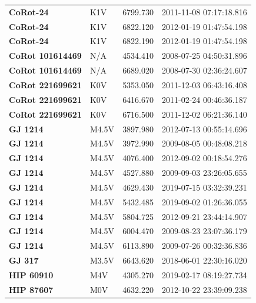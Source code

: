 \documentclass[linenumbers]{aastex701}
\providecommand{\DIFadd}[1]{{\bf #1}} %
\providecommand{\DIFaddbegin}{} %
\providecommand{\DIFaddend}{} %
\begin{document}
\begin{longtable}{|l|l|l|c|}
 \DIFaddbegin \DIFadd{CoRot-24 }\DIFaddend & K1V & 6799.730 & 2011-11-08 07:17:18.816 \\
 \DIFaddbegin \DIFadd{CoRot-24 }\DIFaddend & K1V & 6822.120 & 2012-01-19 01:47:54.198 \\
 \DIFaddbegin \DIFadd{CoRot-24 }\DIFaddend & K1V & 6822.190 & 2012-01-19 01:47:54.198 \\
 \DIFaddbegin \DIFadd{CoRot 101614469 }\DIFaddend & N/A  & 4534.410 & 2008-07-25 04:50:31.896 \\
 \DIFaddbegin \DIFadd{CoRot 101614469 }\DIFaddend & N/A & 6689.020 & 2008-07-30 02:36:24.607 \\
 \DIFaddbegin \DIFadd{CoRot 221699621 }\DIFaddend & K0V & 5353.050 & 2011-12-03 06:43:16.408 \\
 \DIFaddbegin \DIFadd{CoRot 221699621 }\DIFaddend & K0V & 6416.670 & 2011-02-24 00:46:36.187 \\
 \DIFaddbegin \DIFadd{CoRot 221699621 }\DIFaddend & K0V & 6716.500 & 2011-12-02 06:21:36.140 \\
 \DIFaddbegin \DIFadd{GJ 1214 }\DIFaddend & M4.5V & 3897.980 & 2012-07-13 00:55:14.696 \\
 \DIFaddbegin \DIFadd{GJ 1214 }\DIFaddend & M4.5V & 3972.990 & 2009-08-05 00:48:08.218 \\
 \DIFaddbegin \DIFadd{GJ 1214 }\DIFaddend & M4.5V & 4076.400 & 2012-09-02 00:18:54.276 \\
 \DIFaddbegin \DIFadd{GJ 1214 }\DIFaddend & M4.5V & 4527.880 & 2009-09-03 23:26:05.655 \\
 \DIFaddbegin \DIFadd{GJ 1214 }\DIFaddend & M4.5V & 4629.430 & 2019-07-15 03:32:39.231 \\
 \DIFaddbegin \DIFadd{GJ 1214 }\DIFaddend & M4.5V & 5432.485 & 2019-09-02 01:26:36.055 \\
 \DIFaddbegin \DIFadd{GJ 1214 }\DIFaddend & M4.5V & 5804.725 & 2012-09-21 23:44:14.907 \\
 \DIFaddbegin \DIFadd{GJ 1214 }\DIFaddend & M4.5V & 6004.470 & 2009-08-23 23:07:36.179 \\
 \DIFaddbegin \DIFadd{GJ 1214 }\DIFaddend & M4.5V & 6113.890 & 2009-07-26 00:32:36.836 \\
 \DIFaddbegin \DIFadd{GJ 317 }\DIFaddend & M3.5V & 6643.620 & 2018-06-01 22:30:16.020 \\
 \DIFaddbegin \DIFadd{HIP 60910 }\DIFaddend & M4V & 4305.270 & 2019-02-17 08:19:27.734 \\
 \DIFaddbegin \DIFadd{HIP 87607 }\DIFaddend & M0V & 4632.220 & 2012-10-22 23:39:09.238 \\

\end{longtable}
\end{document}
